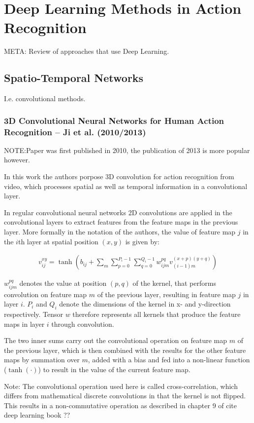 \section{Deep Learning Methods in Action Recognition}
META: Review of approaches that use Deep Learning.

\subsection{Spatio-Temporal Networks}
I.e. convolutional methods.

\subsubsection{3D Convolutional Neural Networks for Human Action Recognition -- Ji et al. (2010/2013)}
NOTE:Paper was first published in 2010, the publication of 2013 is more popular however.

In this work \cite{ji_3d_2013} the authors porpose 3D convolution for action recognition from video, which processes spatial as well as temporal information in a convolutional layer.

In regular convolutional neural networks 2D convolutions are applied in the convolutional layers to extract features from the feature maps in the previous layer. More formally in the notation of the authors, the value of feature map $j$ in the $i$th layer at spatial position $(x,y)$ is given by:

\begin{align*}
    v_{ij}^{xy} = \tanh \left( b_{ij} + \sum_m \sum_{p=0}^{P_i -1} \sum_{q = 0}^{Q_i - 1} w_{ijm}^{pq} v_{(i-1)m}^{(x+p)(y+q)} \right)
\end{align*}

$w_{ijm}^{pq}$ denotes the value at position $(p,q)$ of the kernel, that performs convolution on feature map $m$ of the previous layer, resulting in feature map $j$ in layer $i$.
$P_i$ and $Q_i$ denote the dimensions of the kernel in x- and y-direction respectively.
Tensor $w$ therefore represents all kernels that produce the feature maps in layer $i$ through convolution.

The two inner sums carry out the convolutional operation on feature map $m$ of the previous layer, which is then combined with the results for the other feature maps by summation over $m$, added with a bias and fed into a non-linear function ($\tanh(\cdot)$) to result in the value of the current feature map.

Note: The convolutional operation used here is called cross-correlation, which differs from mathematical discrete convolutions in that the kernel is not flipped. This results in a non-commutative operation as described in chapter 9 of cite deep learning book ??

